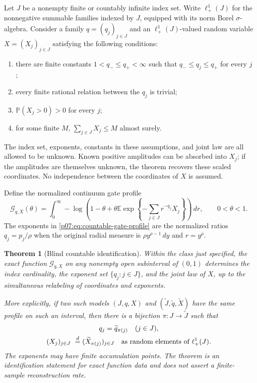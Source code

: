\documentclass[11pt,letterpaper]{article}
\newtheorem{theorem}{Theorem}[section]
\theoremstyle{definition}
\theoremstyle{remark}
\newcommand{\E}{\mathbb E}
\newcommand{\Pp}{\mathbb P}
\newcommand{\1}{\mathbf 1}
\begin{document}
Let $J$ be a nonempty finite or countably infinite index set. Write
$\ell^1_+(J)$ for the nonnegative summable families indexed by $J$,
equipped with its norm Borel $\sigma$-algebra. Consider a family
$q=(q_j)_{j\in J}$ and an $\ell^1_+(J)$-valued random variable
$X=(X_j)_{j\in J}$ satisfying the following conditions:
\begin{enumerate}[label=(\roman*)]
\item there are finite constants $1<q_-\leq q_+<\infty$ such that
      $q_-\leq q_j\leq q_+$ for every $j$;
\item every finite rational relation between the $q_j$ is trivial;
\item $\Pp(X_j>0)>0$ for every $j$;
\item for some finite $M$, $\sum_{j\in J}X_j\leq M$ almost surely.
\end{enumerate}
The index set, exponents, constants in these assumptions, and joint law
are all allowed to be unknown. Known positive amplitudes can be absorbed
into $X_j$; if the amplitudes are themselves unknown, the theorem recovers
these scaled coordinates. No independence between the coordinates of
$X$ is assumed.

Define the normalized continuum gate profile
\begin{equation}\label{p07:eq:countable-gate-profile}
 \mathcal G_{q,X}(\theta)
 =\int_0^\infty
 -\log\left(1-\theta+
       \theta\E\exp\left\{-\sum_{j\in J}r^{-q_j}X_j\right\}\right)
 \,dr,\qquad 0<\theta<1.
\end{equation}
The exponents in \eqref{p07:eq:countable-gate-profile} are the normalized
ratios $q_j=p_j/\rho$ when the original radial measure is
$\rho y^{\rho-1}\,dy$ and $r=y^\rho$.

\begin{theorem}[Blind countable identification]
\label{p07:thm:countable-blind-gate}
Within the class just specified, the exact function
$\mathcal G_{q,X}$ on any nonempty open subinterval of $(0,1)$ determines
the index cardinality, the exponent set $\{q_j:j\in J\}$, and the joint
law of $X$, up to the simultaneous relabeling of coordinates and
exponents.

More explicitly, if two such models $(J,q,X)$ and $(\widetilde J,
\widetilde q,\widetilde X)$ have the same profile on such an interval,
then there is a bijection $\pi:J\to\widetilde J$ such that
\[
 \begin{gathered}
 q_j=\widetilde q_{\pi(j)}\quad(j\in J),\\
 (X_j)_{j\in J}\ \stackrel{d}{=}
 (\widetilde X_{\pi(j)})_{j\in J}
 \quad\hbox{as random elements of }\ell^1_+(J).
 \end{gathered}
\]
The exponents may have finite accumulation points. The theorem is an
identification statement for exact function data and does not assert a
finite-sample reconstruction rate.
\end{theorem}
\end{document}
